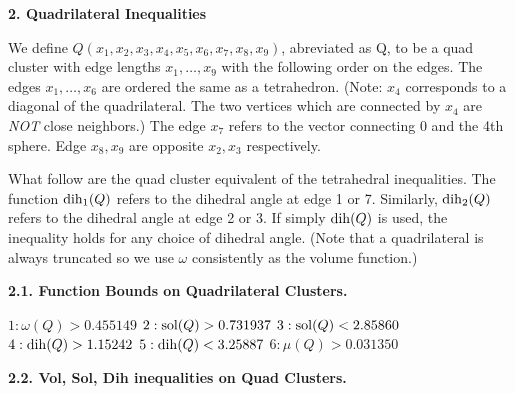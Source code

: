 {\bf  2. Quadrilateral Inequalities}

\smallskip

We define $Q(x_1,x_2,x_3,x_4,x_5,x_6,x_7,x_8,x_9)$, abreviated as Q, to be a quad cluster with edge lengths $x_1,\dots, x_9$ with the following order on the edges.  The edges $x_1,\dots, x_6$ are ordered the same as a tetrahedron.  (Note: $x_4$ corresponds to a diagonal of the quadrilateral.  The two vertices which are connected by $x_4$ are {\sl NOT} close neighbors.) The edge $x_7$ refers to the vector connecting 0 and the 4th sphere.  Edge $x_8,x_9$ are opposite $x_2,x_3$ respectively.

What follow are the quad cluster equivalent of the tetrahedral inequalities.
The function $\operatorname{dih}_1(Q)$ refers to the dihedral angle at edge 1 or 7.  Similarly, $\operatorname{dih}_2(Q)$ refers to the dihedral angle at edge 2 or 3.  If simply $\operatorname{dih}(Q)$ is used, the inequality holds for any choice of dihedral angle.  (Note that a quadrilateral is always truncated so we use $\omega$ consistently as the volume function.)

{\bf 2.1. Function Bounds on Quadrilateral Clusters.}

$1:  \omega(Q) > 0.455149$\newline
$2:  \operatorname{sol}(Q) > 0.731937$\newline
$3:  \operatorname{sol}(Q) < 2.85860$\newline
$4:  \operatorname{dih}(Q) > 1.15242$\newline
$5:  \operatorname{dih}(Q) < 3.25887$\newline
$6:  \mu(Q) > 0.031350$\newline

\smallskip

{\bf 2.2. Vol, Sol, Dih inequalities on Quad Clusters.}

\smallskip

